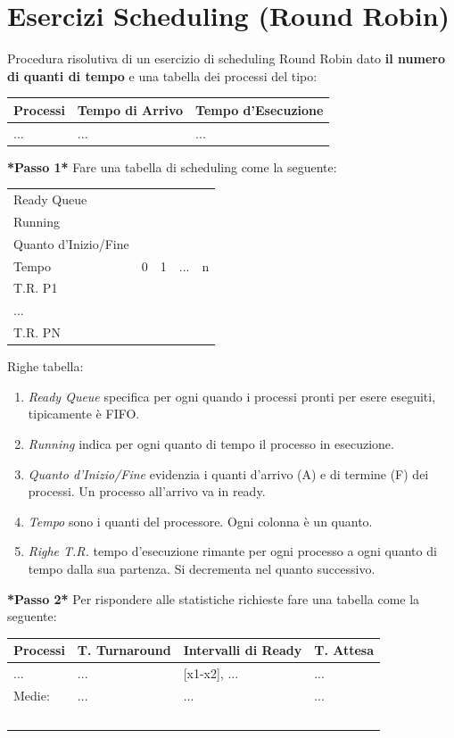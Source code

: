 \section{Esercizi Scheduling (Round Robin)}
Procedura risolutiva di un esercizio di scheduling Round Robin dato \textbf{il numero di quanti di tempo} e una tabella dei processi del tipo:


\begin{center}
	\begin{tabular}{lll}
		Processi & Tempo di Arrivo & Tempo d'Esecuzione \\
		\hline
		... & ... & ...
	\end{tabular}
\end{center}
\textbf{*Passo 1*} Fare una  tabella di scheduling come la seguente:
\begin{center}
	\begin{tabular}{l|llll}
		Ready Queue & & & & \\
		Running & & & & \\
		Quanto d'Inizio/Fine & & & & \\
		\hline
		Tempo & 0 & 1 & ... & n \\
		\hline
		T.R. P1 & & & & \\
		... & & & & \\
		T.R. PN & & & & \\
	\end{tabular}
\end{center}
Righe tabella:
\begin{enumerate}
	\item \textit{Ready Queue} specifica per ogni quando i processi pronti per esere eseguiti, tipicamente è FIFO.
	\item \textit{Running} indica per ogni quanto di tempo il processo in esecuzione.
	\item \textit{Quanto d'Inizio/Fine} evidenzia i quanti d'arrivo (A) e di termine (F) dei processi. Un processo all'arrivo va in ready.
	\item \textit{Tempo} sono i quanti del processore. Ogni colonna è un quanto.
	\item \textit{Righe T.R.} tempo d'esecuzione rimante per ogni processo a ogni quanto di tempo dalla sua partenza. Si decrementa nel quanto successivo.
\end{enumerate}
\textbf{*Passo 2*} Per rispondere alle statistiche richieste fare una tabella come la seguente:
\begin{center}
	\begin{tabular}{llll}
	Processi & T. Turnaround & Intervalli di Ready & T. Attesa \\
	\hline
	...	& ... & [x1-x2], ... & ... \\
	\hline
	Medie: & ... & ... & ... \\\
	\end{tabular}
\end{center}
